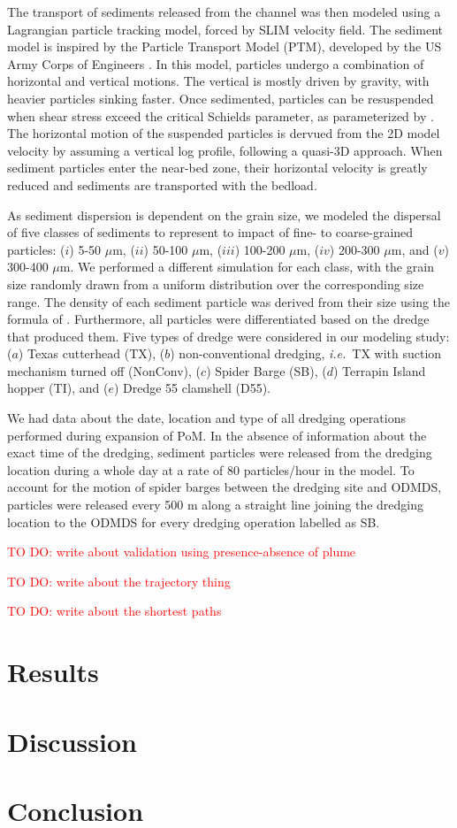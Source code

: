 \documentclass[preprint,12pt,authoryear]{elsarticle}
\newcommand{\ie}{{\it i.e.}\ }
\newcommand{\todo}[1]{\textcolor{red}{TO DO: #1}}
\begin{document}
The transport of sediments released from the channel was then modeled using a Lagrangian particle tracking model, forced by SLIM velocity field. The sediment model is inspired by the Particle Transport Model (PTM), developed by the US Army Corps of Engineers \citep{macdonald2006ptm}. In this model, particles undergo a combination of horizontal and vertical motions. The vertical is mostly driven by gravity, with heavier particles sinking faster. Once sedimented, particles can be resuspended when shear stress exceed the critical Schields parameter, as parameterized by \cite{soulsby1997threshold}. The horizontal motion of the suspended particles is dervued from the 2D model velocity by assuming a vertical log profile, following a quasi-3D approach. When sediment particles enter the near-bed zone, their horizontal velocity is greatly reduced and sediments are transported with the bedload.

As sediment dispersion is dependent on the grain size, we modeled the dispersal of five classes of sediments to represent to impact of fine- to coarse-grained particles: ($i$) 5-50 $\mu$m, ($ii$) 50-100 $\mu$m, ($iii$) 100-200 $\mu$m, ($iv$) 200-300 $\mu$m, and ($v$) 300-400 $\mu$m. We performed a  different simulation for each class, with the grain size randomly drawn from a uniform distribution over the corresponding size range. The density of each sediment particle was derived from their size using the formula of \cite{hamilton1982sound}. Furthermore, all particles were differentiated based on the dredge that produced them. Five types of dredge were considered in our modeling study: ($a$) Texas cutterhead (TX), ($b$) non-conventional dredging, \ie TX with suction mechanism turned off (NonConv), ($c$) Spider Barge (SB), ($d$) Terrapin Island hopper (TI), and ($e$) Dredge 55 clamshell (D55).

We had data about the date, location and type of all dredging operations performed during expansion of PoM. In the absence of information about the exact time of the dredging, sediment particles were released from the dredging location during a whole day at a rate of 80 particles/hour in the model. To account for the motion of spider barges between the dredging site and ODMDS, particles were released every 500 m along a straight line joining the dredging location to the ODMDS for every dredging operation labelled as SB. 

\todo{write about validation using presence-absence of plume}

\todo{write about the trajectory thing}

\todo{write about the shortest paths}

  
\section{Results}

\section{Discussion}

\section{Conclusion}


 

\end{document}
